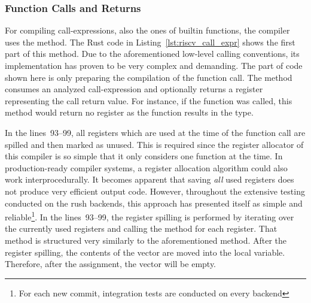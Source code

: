 \subsubsection{Function Calls and Returns}

For compiling call-expressions, also the ones of builtin functions, the compiler uses the  method.
The Rust code in Listing~\ref{lst:riscv_call_expr} shows the first part of this method.%
%
%
Due to the aforementioned low-level calling conventions,
its implementation has proven to be very complex and demanding.
The part of code shown here is only preparing the compilation of the function call.
The method consumes an analyzed call-expression and optionally returns a register representing the call return value.
For instance, if the  function was called, this method would return no register as the  function results in the \qVerb{!} type.

In the lines~93--99, all registers which are used at the time of the function call are spilled and then marked as unused.
This is required since the register allocator of this compiler is so simple that it only considers one function at the time.
In production-ready compiler systems, a register allocation algorithm could also work interprocedurally.
It becomes apparent that saving \emph{all} used registers does not produce very efficient output code.
However, throughout the extensive testing conducted on the rush backends, this approach has presented itself as simple and reliable\footnote{For each new commit, \rushCountTests integration tests are conducted on every backend}.
In the lines~93--99, the register spilling is performed by iterating over the currently used registers and calling the  method for each register.
That method is structured very similarly to the aforementioned  method.
After the register spilling, the contents of the  vector are moved into the local  variable.
Therefore, after the assignment, the  vector will be empty.


